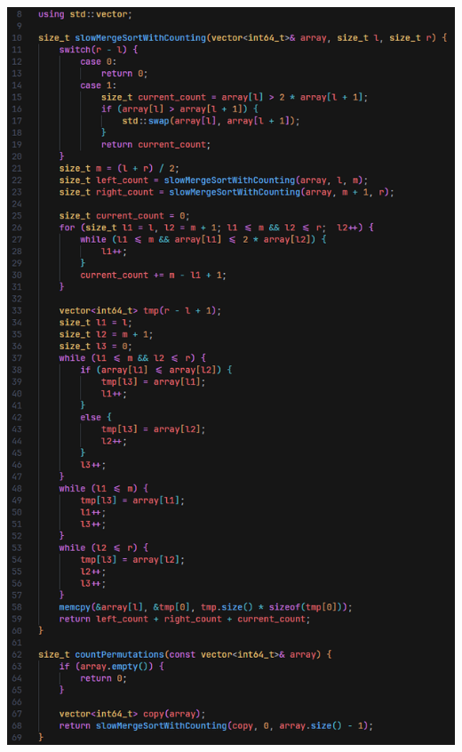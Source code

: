 \documentclass[11pt,a4paper]{article} %
\begin{document}
\includegraphics[scale=0.9]{a4_code_2.png}
\end{document}
